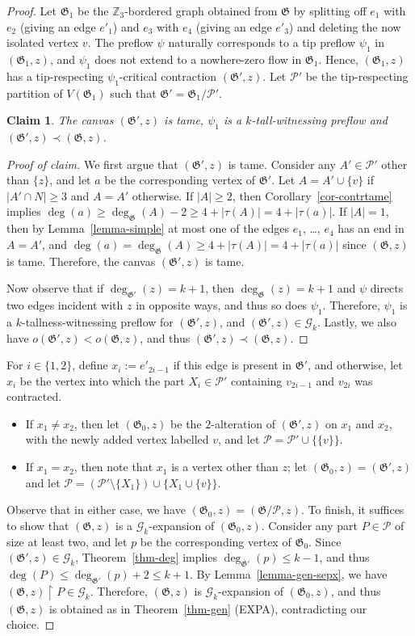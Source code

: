 \documentclass{article}
\newcommand{\Z}{\mathbb{Z}_3}
\newcommand{\PP}{\mathcal{P}}
\newcommand{\GG}{\mathcal{G}}
\newcommand\g{\mathfrak{G}}
\newtheorem*{claim*}{Claim}
\newenvironment{subproof}{%
  \renewcommand{\qedsymbol}{$\blacksquare$}%
  \begin{proof}[Proof of claim]%
}{%
  \end{proof}%
}
\begin{document}
\begin{proof}
Let $\g_1$ be the $\Z$-bordered graph obtained from $\g$ by splitting off $e_1$ with $e_2$ (giving an edge $e'_1$) and $e_3$ with $e_4$
(giving an edge $e'_3$) and deleting the now isolated vertex $v$.
The preflow $\psi$ naturally corresponds to a tip preflow $\psi_1$ in $(\g_1,z)$, and $\psi_1$ does not extend to a nowhere-zero flow in $\g_1$.
Hence, $(\g_1,z)$ has a tip-respecting $\psi_1$-critical contraction $(\g',z)$. Let $\PP'$ be the tip-respecting partition of $V(\g_1)$
such that $\g'=\g_1/\PP'$.
\begin{claim*}
The canvas $(\g',z)$ is tame, $\psi_{1}$ is a $k$-tall-witnessing preflow and $(\g',z) \prec (\g,z)$. 
\end{claim*}

\begin{subproof}
We first argue that $(\g',z)$ is tame. Consider any $A'\in \PP'$ other than $\{z\}$, and let $a$ be the corresponding vertex of $\g'$.
Let $A=A'\cup\{v\}$ if $|A'\cap N|\ge 3$ and $A=A'$ otherwise.
If $|A|\ge 2$, then Corollary~\ref{cor-contrtame} implies $\deg(a)\ge \deg_{\g}(A)-2\ge 4+|\tau(A)|=4+|\tau(a)|$.
If $|A|=1$, then by Lemma~\ref{lemma-simple} at most one of the edges $e_1$, \ldots, $e_4$ has an end in $A=A'$,
and $\deg(a)=\deg_{\g}(A)\ge 4+|\tau(A)|=4+|\tau(a)|$ since $(\g,z)$ is tame.  Therefore, the canvas $(\g',z)$ is tame.

Now observe that if $\deg_{\g'}(z)=k+1$, then $\deg_{\g}(z)=k+1$ and $\psi$ directs two edges incident with $z$ in opposite ways,
and thus so does $\psi_1$.  Therefore, $\psi_1$ is a $k$-tallness-witnessing preflow for $(\g', z)$, and $(\g',z)\in \GG_k$. Lastly, we also have $o(\g',z)<o(\g,z)$, and thus $(\g',z)\prec (\g,z)$.
\end{subproof}
 For $i\in \{1,2\}$, define $x_i:=e'_{2i-1}$ if this edge is present in $\g'$, and otherwise, let $x_i$ be the vertex into which the part $X_i\in\PP'$ containing $v_{2i-1}$ and $v_{2i}$ was contracted.
\begin{itemize}
\item If $x_1\neq x_2$, then let $(\g_0,z)$ be the $2$-alteration of $(\g',z)$ on $x_1$ and $x_2$, with the newly added vertex labelled $v$,
and let $\PP=\PP'\cup\{\{v\}\}$.
\item If $x_1=x_2$, then note that $x_1$ is a vertex other than $z$; let $(\g_0,z)=(\g',z)$ and let $\PP=(\PP'\setminus\{X_1\})\cup\{X_1\cup \{v\}\}$.
\end{itemize}
Observe that in either case, we have $(\g_0,z)=(\g / \PP,z)$. To finish, it suffices to show that $(\g,z)$ is a $\GG_{k}$-expansion of $(\g_{0},z)$.  Consider any part $P\in\PP$ of size at least two, and let $p$ be the corresponding vertex of $\g_0$.
Since $(\g',z)\in \GG_k$, Theorem~\ref{thm-deg} implies $\deg_{\g'}(p)\le k-1$, and thus $\deg(P)\le \deg_{\g'}(p)+2\le k+1$.
By Lemma~\ref{lemma-gen-sepx}, we have $(\g,z)\restriction P\in \GG_k$.  
Therefore, $(\g,z)$ is $\GG_k$-expansion of $(\g_0,z)$, and thus $(\g,z)$ is obtained as in Theorem~\ref{thm-gen} (EXPA), contradicting our choice.
\end{proof}
\end{document}
